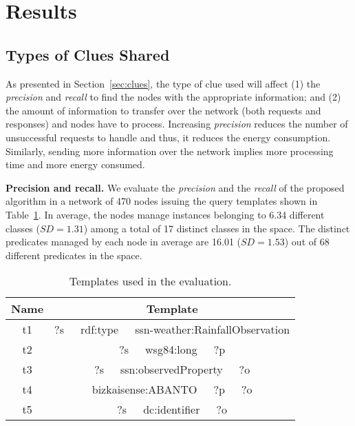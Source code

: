\section{Results}
\label{results}

\subsection{Types of Clues Shared}
\label{sec:clues_eval}
As presented in Section~\ref{sec:clues}, the type of clue used will affect
(1) the \emph{precision} and \emph{recall} to find the nodes with the appropriate information; %
and (2) the amount of information to transfer over the network (both requests and responses) and nodes have to process.
Increasing \emph{precision} reduces the number of unsuccessful requests to handle and thus, it reduces the energy consumption. 
Similarly, sending more information over the network implies more processing time and more energy consumed.

\medskip

\noindent\textbf{Precision and recall.}
We evaluate the \emph{precision} and the \emph{recall} of the proposed algorithm in a network of 470 nodes issuing the query templates shown in Table~\ref{tab:evaluationTemplates}.
In average, the nodes manage instances belonging to 6.34 different classes ($SD=1.31$) among a total of 17 distinct classes in the space.
The distinct predicates managed by each node in average are 16.01 ($SD=1.53$) out of 68 different predicates in the space.

\begin{table}[h!tbp]
\centering
\begin{tabular}{| c | c |}
\hline
Name & Template \\
\hline
t1 & ?s~~~rdf:type~~~ssn-weather:RainfallObservation \\
t2 & ?s~~~wsg84:long~~~?p \\
t3 & ?s~~~ssn:observedProperty~~~?o \\
t4 & bizkaisense:ABANTO~~~?p~~~?o \\
t5 & ?s~~~dc:identifier~~~?o \\
\hline
\end{tabular}
\caption{Templates used in the evaluation.}
\label{tab:evaluationTemplates}
\end{table}


